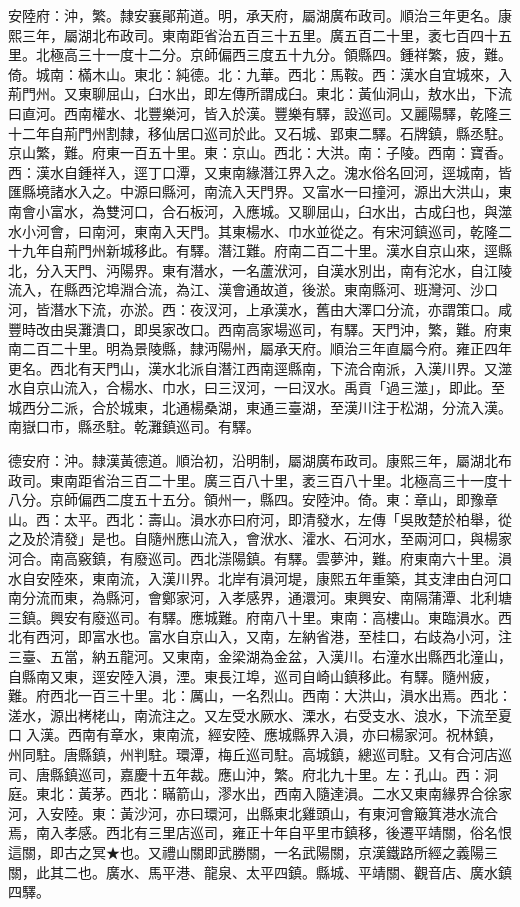 \begin{pinyinscope}
安陸府：沖，繁。隸安襄鄖荊道。明，承天府，屬湖廣布政司。順治三年更名。康熙三年，屬湖北布政司。東南距省治五百三十五里。廣五百二十里，袤七百四十五里。北極高三十一度十二分。京師偏西三度五十九分。領縣四。鍾祥繁，疲，難。倚。城南：樠木山。東北：純德。北：九華。西北：馬鞍。西：漢水自宜城來，入荊門州。又東聊屈山，臼水出，即左傳所謂成臼。東北：黃仙洞山，敖水出，下流曰直河。西南權水、北豐樂河，皆入於漢。豐樂有驛，設巡司。又麗陽驛，乾隆三十二年自荊門州割隸，移仙居口巡司於此。又石城、郢東二驛。石牌鎮，縣丞駐。京山繁，難。府東一百五十里。東：京山。西北：大洪。南：子陵。西南：寶香。西：漢水自鍾祥入，逕丁口潭，又東南緣潛江界入之。溾水俗名回河，逕城南，皆匯縣境諸水入之。中源曰縣河，南流入天門界。又富水一曰撞河，源出大洪山，東南會小富水，為雙河口，合石板河，入應城。又聊屈山，臼水出，古成臼也，與澨水小河會，曰南河，東南入天門。其東楊水、巾水並從之。有宋河鎮巡司，乾隆二十九年自荊門州新城移此。有驛。潛江難。府南二百二十里。漢水自京山來，逕縣北，分入天門、沔陽界。東有潛水，一名蘆洑河，自漢水別出，南有沱水，自江陵流入，在縣西沱埠淵合流，為江、漢會通故道，後淤。東南縣河、班灣河、沙口河，皆潛水下流，亦淤。西：夜汊河，上承漢水，舊由大澤口分流，亦謂策口。咸豐時改由吳灘潰口，即吳家改口。西南高家場巡司，有驛。天門沖，繁，難。府東南二百二十里。明為景陵縣，隸沔陽州，屬承天府。順治三年直屬今府。雍正四年更名。西北有天門山，漢水北派自潛江西南逕縣南，下流合南派，入漢川界。又澨水自京山流入，合楊水、巾水，曰三汊河，一曰汊水。禹貢「過三澨」，即此。至城西分二派，合於城東，北通楊桑湖，東通三臺湖，至漢川注于松湖，分流入漢。南嶽口市，縣丞駐。乾灘鎮巡司。有驛。

德安府：沖。隸漢黃德道。順治初，沿明制，屬湖廣布政司。康熙三年，屬湖北布政司。東南距省治三百二十里。廣三百八十里，袤三百八十里。北極高三十一度十八分。京師偏西二度五十五分。領州一，縣四。安陸沖。倚。東：章山，即豫章山。西：太平。西北：壽山。溳水亦曰府河，即清發水，左傳「吳敗楚於柏舉，從之及於清發」是也。自隨州應山流入，會洑水、瀖水、石河水，至兩河口，與楊家河合。南高竅鎮，有廢巡司。西北漴陽鎮。有驛。雲夢沖，難。府東南六十里。溳水自安陸來，東南流，入漢川界。北岸有溳河堤，康熙五年重築，其支津由白河口南分流而東，為縣河，會鄭家河，入孝感界，通澴河。東興安、南隔蒲潭、北利塘三鎮。興安有廢巡司。有驛。應城難。府南八十里。東南：高樓山。東臨溳水。西北有西河，即富水也。富水自京山入，又南，左納省港，至桂口，右歧為小河，注三臺、五當，納五龍河。又東南，金梁湖為金盆，入漢川。右潼水出縣西北潼山，自縣南又東，逕安陸入溳，湮。東長江埠，巡司自崎山鎮移此。有驛。隨州疲，難。府西北一百三十里。北：厲山，一名烈山。西南：大洪山，溳水出焉。西北：溠水，源出栲栳山，南流注之。又左受水厥水、溧水，右受支水、浪水，下流至夏口入漢。西南有章水，東南流，經安陸、應城縣界入溳，亦曰楊家河。祝林鎮，州同駐。唐縣鎮，州判駐。環潭，梅丘巡司駐。高城鎮，總巡司駐。又有合河店巡司、唐縣鎮巡司，嘉慶十五年裁。應山沖，繁。府北九十里。左：孔山。西：洞庭。東北：黃茅。西北：瞞箭山，漻水出，西南入隨達溳。二水又東南緣界合徐家河，入安陸。東：黃沙河，亦曰環河，出縣東北雞頭山，有東河會簸箕港水流合焉，南入孝感。西北有三里店巡司，雍正十年自平里市鎮移，後遷平靖關，俗名恨這關，即古之冥★也。又禮山關即武勝關，一名武陽關，京漢鐵路所經之義陽三關，此其二也。廣水、馬平港、龍泉、太平四鎮。縣城、平靖關、觀音店、廣水鎮四驛。


\end{pinyinscope}
